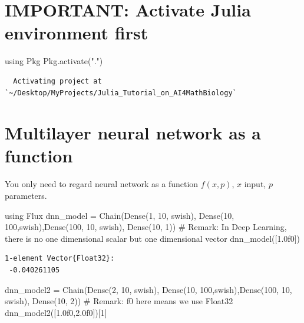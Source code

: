 \documentclass[
  letterpaper,
  DIV=11,
  numbers=noendperiod]{scrreport}
\newenvironment{Shaded}{\begin{snugshade}}{\end{snugshade}}
\newcommand{\BuiltInTok}[1]{\textcolor[rgb]{0.00,0.23,0.31}{#1}}
\newcommand{\CommentTok}[1]{\textcolor[rgb]{0.37,0.37,0.37}{#1}}
\newcommand{\FloatTok}[1]{\textcolor[rgb]{0.68,0.00,0.00}{#1}}
\newcommand{\FunctionTok}[1]{\textcolor[rgb]{0.28,0.35,0.67}{#1}}
\newcommand{\ImportTok}[1]{\textcolor[rgb]{0.00,0.46,0.62}{#1}}
\newcommand{\NormalTok}[1]{\textcolor[rgb]{0.00,0.23,0.31}{#1}}
\newcommand{\OperatorTok}[1]{\textcolor[rgb]{0.37,0.37,0.37}{#1}}
\newcommand{\StringTok}[1]{\textcolor[rgb]{0.13,0.47,0.30}{#1}}
\begin{document}
\section{IMPORTANT: Activate Julia environment
first}\label{important-activate-julia-environment-first}

\begin{Shaded}
\begin{Highlighting}[]
\ImportTok{using} \BuiltInTok{Pkg}
\BuiltInTok{Pkg}\NormalTok{.}\FunctionTok{activate}\NormalTok{(}\StringTok{"."}\NormalTok{)}
\end{Highlighting}
\end{Shaded}

\begin{verbatim}
  Activating project at `~/Desktop/MyProjects/Julia_Tutorial_on_AI4MathBiology`
\end{verbatim}

\section{Multilayer neural network as a
function}\label{multilayer-neural-network-as-a-function}

You only need to regard neural network as a function \(f(x,p)\), \(x\)
input, \(p\) parameters.

\begin{Shaded}
\begin{Highlighting}[]
\ImportTok{using} \BuiltInTok{Flux}
\NormalTok{dnn\_model }\OperatorTok{=} \FunctionTok{Chain}\NormalTok{(}\FunctionTok{Dense}\NormalTok{(}\FloatTok{1}\NormalTok{, }\FloatTok{10}\NormalTok{, swish), }\FunctionTok{Dense}\NormalTok{(}\FloatTok{10}\NormalTok{, }\FloatTok{100}\NormalTok{,swish),}\FunctionTok{Dense}\NormalTok{(}\FloatTok{100}\NormalTok{, }\FloatTok{10}\NormalTok{, swish), }\FunctionTok{Dense}\NormalTok{(}\FloatTok{10}\NormalTok{, }\FloatTok{1}\NormalTok{))}
\CommentTok{\# Remark: In Deep Learning, there is no one dimensional scalar but one dimensional vector }
\FunctionTok{dnn\_model}\NormalTok{([}\FloatTok{1.0f0}\NormalTok{])}
\end{Highlighting}
\end{Shaded}

\begin{verbatim}
1-element Vector{Float32}:
 -0.040261105
\end{verbatim}

\begin{Shaded}
\begin{Highlighting}[]
\NormalTok{dnn\_model2 }\OperatorTok{=} \FunctionTok{Chain}\NormalTok{(}\FunctionTok{Dense}\NormalTok{(}\FloatTok{2}\NormalTok{, }\FloatTok{10}\NormalTok{, swish), }\FunctionTok{Dense}\NormalTok{(}\FloatTok{10}\NormalTok{, }\FloatTok{100}\NormalTok{,swish),}\FunctionTok{Dense}\NormalTok{(}\FloatTok{100}\NormalTok{, }\FloatTok{10}\NormalTok{, swish), }\FunctionTok{Dense}\NormalTok{(}\FloatTok{10}\NormalTok{, }\FloatTok{2}\NormalTok{))}
\CommentTok{\# Remark: f0 here means we use Float32}
\FunctionTok{dnn\_model2}\NormalTok{([}\FloatTok{1.0f0}\NormalTok{,}\FloatTok{2.0f0}\NormalTok{])[}\FloatTok{1}\NormalTok{]}
\end{Highlighting}
\end{Shaded}
\end{document}
